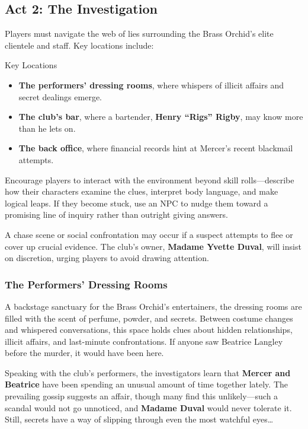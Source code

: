 \subsection{Act 2: The Investigation} 

Players must navigate the web of lies surrounding the Brass Orchid’s elite clientele and staff. Key locations include:
\begin{Example}{Key Locations}
	\begin{itemize}\raggedright
		\item \textbf{The performers’ dressing rooms}, where whispers of illicit affairs and secret dealings emerge.
		\item \textbf{The club’s bar}, where a bartender, \textbf{Henry ``Rigs'' Rigby}, may know more than he lets on.
		\item \textbf{The back office}, where financial records hint at Mercer’s recent blackmail attempts.
	\end{itemize}
\end{Example}

\begin{GmTips}
	Encourage players to interact with the environment beyond skill rolls—describe how their characters examine the clues, interpret body language, and make logical leaps. If they become stuck, use an NPC to nudge them toward a promising line of inquiry rather than outright giving answers.
\end{GmTips}

\noindent
A chase scene or social confrontation may occur if a suspect attempts to flee or cover up crucial evidence. The club’s owner, \textbf{Madame Yvette Duval}, will insist on discretion, urging players to avoid drawing attention.


\subsubsection{The Performers’ Dressing Rooms}
A backstage sanctuary for the Brass Orchid’s entertainers, the dressing rooms are filled with the scent of perfume, powder, and secrets. Between costume changes and whispered conversations, this space holds clues about hidden relationships, illicit affairs, and last-minute confrontations. If anyone saw Beatrice Langley before the murder, it would have been here.

Speaking with the club’s performers, the investigators learn that \textbf{Mercer and Beatrice} have been spending an unusual amount of time together lately. The prevailing gossip suggests an affair, though many find this unlikely—such a scandal would not go unnoticed, and \textbf{Madame Duval} would never tolerate it. Still, secrets have a way of slipping through even the most watchful eyes…


